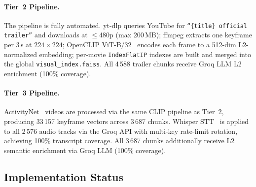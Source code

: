\documentclass[11pt]{article}
\begin{document}
\paragraph{Tier~2 Pipeline.}
{\sloppy The pipeline is fully automated.  yt-dlp queries YouTube for
\texttt{``\{title\} official trailer''} and downloads at $\leq$480p (max
200\,MB); ffmpeg extracts one keyframe per 3\,s at $224\times224$; OpenCLIP
ViT-B/32~\cite{openclip} encodes each frame to a 512-dim L2-normalized
embedding; per-movie \texttt{IndexFlatIP} indexes are built and merged into
the global \texttt{visual\_index.faiss}.  All 4\,588 trailer chunks receive
Groq LLM L2 enrichment (100\% coverage).\par}

\paragraph{Tier~3 Pipeline.}
ActivityNet~\cite{activitynet} videos are processed via the same CLIP
pipeline as Tier~2, producing 33\,157 keyframe vectors across 3\,687 chunks.
Whisper STT~\cite{whisper} is applied to all 2\,576 audio tracks via the
Groq API with multi-key rate-limit rotation, achieving 100\% transcript
coverage.  All 3\,687 chunks additionally receive L2 semantic enrichment via
Groq LLM (100\% coverage).

\subsection{Implementation Status}
\end{document}
